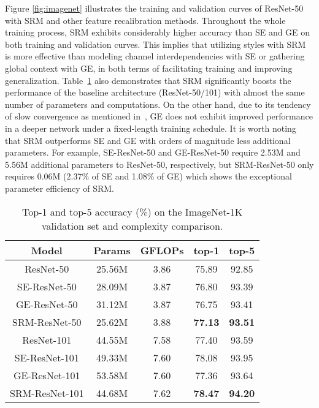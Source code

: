 Figure \ref{fig:imagenet} illustrates the training and validation curves of ResNet-50 with SRM and other feature recalibration methods.
Throughout the whole training process, SRM exhibits considerably higher accuracy than SE and GE on both training and validation curves.
This implies that utilizing styles with SRM is more effective than modeling channel interdependencies with SE or gathering global context with GE, in both terms of facilitating training and improving generalization.
Table~\ref{table:imagenet} also demonstrates that 
SRM significantly boosts the performance of the baseline architecture (ResNet-50/101) with almost the same number of parameters and computations.
On the other hand, due to its tendency of slow convergence as mentioned in~\cite{hu2018gather}, GE does not exhibit improved performance in a deeper network under a fixed-length training schedule. 
It is worth noting that SRM outperforms SE and GE with orders of magnitude less additional parameters.
For example, SE-ResNet-50 and GE-ResNet-50 require 2.53M and 5.56M additional parameters to ResNet-50, respectively, but SRM-ResNet-50 only requires 0.06M (2.37\% of SE and 1.08\% of GE) which shows the exceptional parameter efficiency of SRM.

\begin{table}
\caption{Top-1 and top-5 accuracy (\%) on the ImageNet-1K validation set and complexity comparison.}
\vspace{-1em}
\begin{center}
\begin{tabular}{c|c|c|c|c}
\hline
Model & Params & GFLOPs & top-1 & top-5 \\
\hline
ResNet-50 & 25.56M & 3.86 & 75.89 & 92.85 \\
SE-ResNet-50 & 28.09M & 3.87 & 76.80 & 93.39 \\
GE-ResNet-50 & 31.12M & 3.87 & 76.75 & 93.41 \\
SRM-ResNet-50 & 25.62M & 3.88 & \textbf{77.13}& \textbf{93.51} \\
\hline
ResNet-101 & 44.55M & 7.58 & 77.40 & 93.59 \\
SE-ResNet-101 & 49.33M & 7.60 & 78.08 & 93.95 \\
GE-ResNet-101 & 53.58M & 7.60 & 77.36 & 93.64 \\
SRM-ResNet-101 & 44.68M & 7.62 & \textbf{78.47} & \textbf{94.20}\\
\hline
\end{tabular}
\end{center}
\label{table:imagenet}
\end{table}


